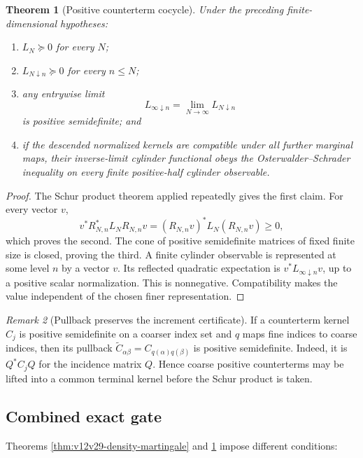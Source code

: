 \documentclass[11pt]{article}
\newtheorem{theorem}{Theorem}[section]
\theoremstyle{remark}
\newtheorem{remark}[theorem]{Remark}
\begin{document}
\begin{theorem}[Positive counterterm cocycle]
\label{thm:v12v29-positive-cocycle}
Under the preceding finite-dimensional hypotheses:
\begin{enumerate}
\item \(L_N\succeq0\) for every \(N\);
\item \(L_{N\downarrow n}\succeq0\) for every \(n\le N\);
\item any entrywise limit
\[
 L_{\infty\downarrow n}
 =
 \lim_{N\to\infty}L_{N\downarrow n}
\]
is positive semidefinite; and
\item if the descended normalized kernels are compatible under all
further marginal maps, their inverse-limit cylinder functional obeys
the Osterwalder--Schrader inequality on every finite positive-half
cylinder observable.
\end{enumerate}
\end{theorem}

\begin{proof}
The Schur product theorem applied repeatedly gives the first claim.
For every vector \(v\),
\[
 v^*R_{N,n}^*L_NR_{N,n}v
 =
 (R_{N,n}v)^*L_N(R_{N,n}v)\ge0,
\]
which proves the second.  The cone of positive semidefinite matrices
of fixed finite size is closed, proving the third.  A finite cylinder
observable is represented at some level \(n\) by a vector \(v\).  Its
reflected quadratic expectation is
\(v^*L_{\infty\downarrow n}v\), up to a positive scalar
normalization.  This is nonnegative.  Compatibility makes the value
independent of the chosen finer representation.
\end{proof}

\begin{remark}[Pullback preserves the increment certificate]
\label{rem:v12v29-pullback}
If a counterterm kernel \(C_j\) is positive semidefinite on a coarser
index set and \(q\) maps fine indices to coarse indices, then its
pullback \(\widetilde C_{\alpha\beta}=C_{q(\alpha)q(\beta)}\) is
positive semidefinite.  Indeed, it is \(Q^*C_jQ\) for the incidence
matrix \(Q\).  Hence coarse positive counterterms may be lifted into
a common terminal kernel before the Schur product is taken.
\end{remark}

\subsection{Combined exact gate}

Theorems \ref{thm:v12v29-density-martingale} and
\ref{thm:v12v29-positive-cocycle} impose different conditions:
\end{document}
